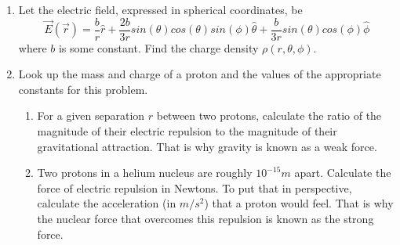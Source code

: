 \documentclass[fleqn]{article}
\begin{document}
\begin{enumerate}
    \item Let the electric field, expressed in spherical coordinates, be
    $$\overrightarrow{E}(\overrightarrow{r})=\dfrac{b}{r}\hat{r}
    +\dfrac{2b}{3r} sin(\theta) cos(\theta) sin(\phi) \hat{\theta}
    +\dfrac{b}{3r} sin(\theta) cos(\phi) \hat{\phi}$$
    where $b$ is some constant. Find the charge density $\rho(r, \theta, \phi)$.

        

    \item Look up the mass and charge of a proton and the values of the appropriate constants for this problem.
    \begin{enumerate}
      \item For a given separation $r$ between two protons, calculate the ratio
      of the magnitude of their electric repulsion to the magnitude of
      their gravitational attraction. That is why gravity is known as a
      weak force.

        

      \item Two protons in a helium nucleus are roughly $10^{-15}m$ apart. Calculate the force of 
      electric repulsion in Newtons. To put that in perspective, calculate the acceleration (in $m/s^2$) that a proton
      would feel. That is why the nuclear force that overcomes this repulsion is known as the strong force.

        

    \end{enumerate}

  \end{enumerate}
\end{document}
